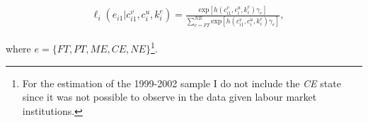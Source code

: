 \documentclass[12pt, a4paper]{article}
\begin{document}


\begin{align}\label{eq:prob_init_state}
& \ell_{i}(e_{i1}|c_{i1}^v,c_i^u,k_i^e) =\frac{\text{exp}[h(c_{i1}^v,c_{i}^{u},k_i^e)\gamma_{e}]}{\sum\limits_{e=FT}^{NE}\text{exp}[h(c_{i1}^v,c_{i}^{u},k_i^e)\gamma_{e}]},
\end{align}

where $e=\{FT,PT,ME,CE,NE\}$\footnote{For the estimation of the 1999-2002 sample I do not include the \emph{CE} state since it was not possible to observe in the data given labour market institutions.}.




\end{document}
